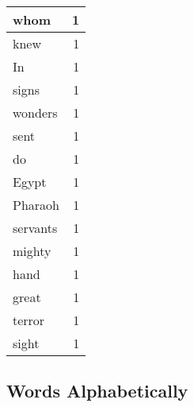 \begin{center}
\begin{longtable}{l|r}
whom & 1 \\ \hline
knew & 1 \\ \hline
In & 1 \\ \hline
signs & 1 \\ \hline
wonders & 1 \\ \hline
sent & 1 \\ \hline
do & 1 \\ \hline
Egypt & 1 \\ \hline
Pharaoh & 1 \\ \hline
servants & 1 \\ \hline
mighty & 1 \\ \hline
hand & 1 \\ \hline
great & 1 \\ \hline
terror & 1 \\ \hline
sight & 1 \\ \hline
\end{longtable}
\end{center}



\normalsize



\subsection{Words Alphabetically}

